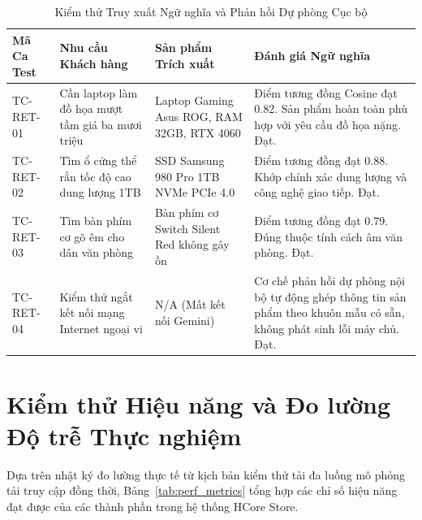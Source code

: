 \begin{table}[H]
\centering
\caption{Kiểm thử Truy xuất Ngữ nghĩa và Phản hồi Dự phòng Cục bộ}
\label{tab:test_rag_retrieval}
\begin{tabularx}{\textwidth}{p{2.2cm}p{4cm}p{3cm}X}
\toprule
\textbf{Mã Ca Test} & \textbf{Nhu cầu Khách hàng} & \textbf{Sản phẩm Trích xuất} & \textbf{Đánh giá Ngữ nghĩa} \\
\midrule
TC-RET-01 & Cần laptop làm đồ họa mượt tầm giá ba mươi triệu & Laptop Gaming Asus ROG, RAM 32GB, RTX 4060 & Điểm tương đồng Cosine đạt 0.82. Sản phẩm hoàn toàn phù hợp với yêu cầu đồ họa nặng. Đạt. \\
\addlinespace
TC-RET-02 & Tìm ổ cứng thể rắn tốc độ cao dung lượng 1TB & SSD Samsung 980 Pro 1TB NVMe PCIe 4.0 & Điểm tương đồng đạt 0.88. Khớp chính xác dung lượng và công nghệ giao tiếp. Đạt. \\
\addlinespace
TC-RET-03 & Tìm bàn phím cơ gõ êm cho dân văn phòng & Bàn phím cơ Switch Silent Red không gây ồn & Điểm tương đồng đạt 0.79. Đúng thuộc tính cách âm văn phòng. Đạt. \\
\addlinespace
TC-RET-04 & Kiểm thử ngắt kết nối mạng Internet ngoại vi & N/A (Mất kết nối Gemini) & Cơ chế phản hồi dự phòng nội bộ tự động ghép thông tin sản phẩm theo khuôn mẫu có sẵn, không phát sinh lỗi máy chủ. Đạt. \\
\bottomrule
\end{tabularx}
\end{table}

\section{Kiểm thử Hiệu năng và Đo lường Độ trễ Thực nghiệm}
Dựa trên nhật ký đo lường thực tế từ kịch bản kiểm thử tải đa luồng mô phỏng tải truy cập đồng thời, Bảng~\ref{tab:perf_metrics} tổng hợp các chỉ số hiệu năng đạt được của các thành phần trong hệ thống HCore Store.

